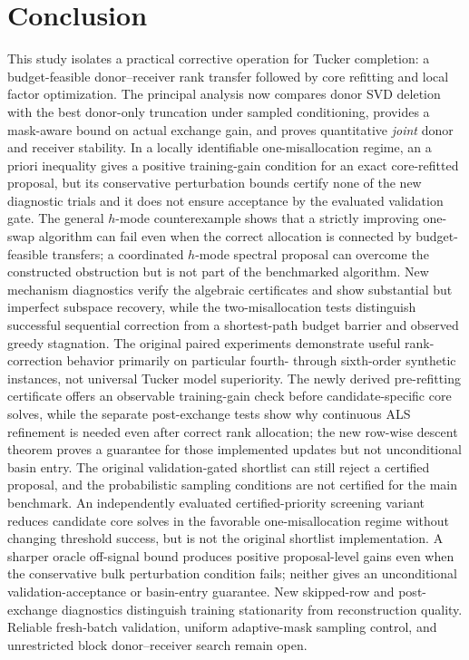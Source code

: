 \documentclass[review,10pt]{elsarticle}
\begin{document}
\section{Conclusion}\label{sec:conclusion}
This study isolates a practical corrective operation for Tucker completion: a budget-feasible donor--receiver rank transfer followed by core refitting and local factor optimization. The principal analysis now compares donor SVD deletion with the best donor-only truncation under sampled conditioning, provides a mask-aware bound on actual exchange gain, and proves quantitative \emph{joint} donor and receiver stability. In a locally identifiable one-misallocation regime, an a priori inequality gives a positive training-gain condition for an exact core-refitted proposal, but its conservative perturbation bounds certify none of the new diagnostic trials and it does not ensure acceptance by the evaluated validation gate. The general $h$-mode counterexample shows that a strictly improving one-swap algorithm can fail even when the correct allocation is connected by budget-feasible transfers; a coordinated $h$-mode spectral proposal can overcome the constructed obstruction but is not part of the benchmarked algorithm. New mechanism diagnostics verify the algebraic certificates and show substantial but imperfect subspace recovery, while the two-misallocation tests distinguish successful sequential correction from a shortest-path budget barrier and observed greedy stagnation. The original paired experiments demonstrate useful rank-correction behavior primarily on particular fourth- through sixth-order synthetic instances, not universal Tucker model superiority. The newly derived pre-refitting certificate offers an observable training-gain check before candidate-specific core solves, while the separate post-exchange tests show why continuous ALS refinement is needed even after correct rank allocation; the new row-wise descent theorem proves a guarantee for those implemented updates but not unconditional basin entry. The original validation-gated shortlist can still reject a certified proposal, and the probabilistic sampling conditions are not certified for the main benchmark. An independently evaluated certified-priority screening variant reduces candidate core solves in the favorable one-misallocation regime without changing threshold success, but is not the original shortlist implementation. A sharper oracle off-signal bound produces positive proposal-level gains even when the conservative bulk perturbation condition fails; neither gives an unconditional validation-acceptance or basin-entry guarantee. New skipped-row and post-exchange diagnostics distinguish training stationarity from reconstruction quality. Reliable fresh-batch validation, uniform adaptive-mask sampling control, and unrestricted block donor--receiver search remain open.
\end{document}
